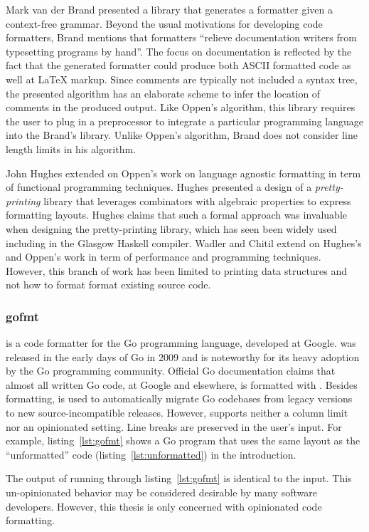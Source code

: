 Mark van der Brand presented a library that generates a formatter given a context-free grammar\autocite{van_den_brand_generation_1996}.
Beyond the usual motivations for developing code formatters, Brand mentions that formatters ``relieve documentation writers from typesetting programs by hand''.
The focus on documentation is reflected by the fact that the generated formatter could produce both ASCII formatted code as well at \LaTeX{} markup.
Since comments are typically not included a syntax tree, the presented algorithm has an elaborate scheme to infer the location of comments in the produced output.
Like Oppen's algorithm, this library requires the user to plug in a preprocessor to integrate a particular programming language into the Brand's library.
Unlike Oppen's algorithm, Brand does not consider line length limits in his algorithm.

John Hughes extended on Oppen's work on language agnostic formatting in term of functional programming techniques\autocite{hughes_design_1995}.
Hughes presented a design of a \emph{pretty-printing} library that leverages combinators with algebraic properties to express formatting layouts.
Hughes claims that such a formal approach was invaluable when designing the pretty-printing library, which has seen been widely used including in the Glasgow Haskell compiler.
Wadler\autocite{wadler_prettier_2003} and Chitil\autocite{swierstra_linear_2009} extend on Hughes's and Oppen's work in term of performance and programming techniques.
However, this branch of work has been limited to printing data structures and not how to format format existing source code.

\subsubsection{gofmt}
\gofmt\autocite{gofmt94:online} is a code formatter for the Go programming language, developed at Google.
\gofmt{} was released in the early days of Go in 2009 and is noteworthy for its heavy adoption by the Go programming community.
Official Go documentation\autocite{CodeR59:online} claims that almost all written Go code, at Google and elsewhere, is formatted with \gofmt{}.
Besides formatting, \gofmt{} is used to automatically migrate Go codebases from legacy versions to new source-incompatible releases.
However, \gofmt{} supports neither a column limit nor an opinionated setting.
Line breaks are preserved in the user's input.
For example, listing~\ref{lst:gofmt} shows a Go program that uses the same layout as the ``unformatted'' code (listing~\ref{lst:unformatted}) in the introduction.

The output of running \gofmt{} through listing~\ref{lst:gofmt} is identical to the input.
This un-opinionated behavior may be considered desirable by many software developers.
However, this thesis is only concerned with opinionated code formatting.

